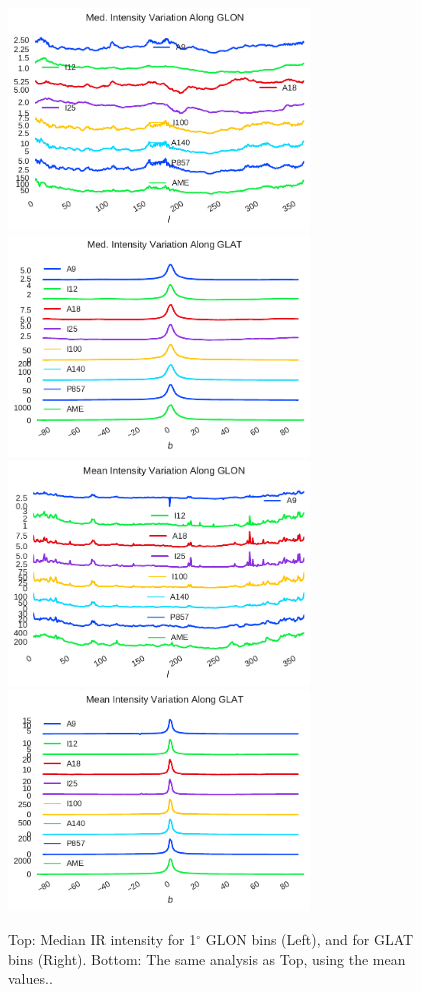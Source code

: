 \documentclass[preprint2,longabstract]{aastex}
\begin{document}
      \begin{figure}
        \label{fig:IRvbyGLOTandGLON}
        \includegraphics[width=80mm]{../Plots/IntensityByGLON_median.pdf}
        \includegraphics[width=80mm]{../Plots/IntensityByGLAT_median.pdf}
        \includegraphics[width=80mm]{../Plots/IntensitybyGLON_mean.pdf}
        \includegraphics[width=80mm]{../Plots/IntensityByGLAT_mean.pdf}
        \centering
        \caption{Top: Median IR intensity  for 1$^{\circ}$ GLON bins (Left), and for GLAT bins (Right). Bottom: The same analysis as Top, using the mean values..}
      \end{figure}
\end{document}
